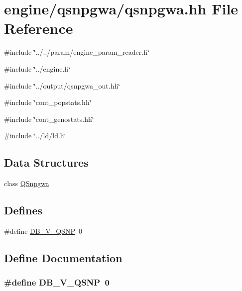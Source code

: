 \hypertarget{qsnpgwa_8hh}{
\section{engine/qsnpgwa/qsnpgwa.hh File Reference}
\label{qsnpgwa_8hh}
}
{\ttfamily \#include \char`\"{}../../param/engine\_\-param\_\-reader.h\char`\"{}}\par
{\ttfamily \#include \char`\"{}../engine.h\char`\"{}}\par
{\ttfamily \#include \char`\"{}../output/qsnpgwa\_\-out.hh\char`\"{}}\par
{\ttfamily \#include \char`\"{}cont\_\-popstats.hh\char`\"{}}\par
{\ttfamily \#include \char`\"{}cont\_\-genostats.hh\char`\"{}}\par
{\ttfamily \#include \char`\"{}../ld/ld.h\char`\"{}}\par
\subsection*{Data Structures}
\begin{DoxyCompactItemize}
\item 
class \hyperlink{classQSnpgwa}{QSnpgwa}
\end{DoxyCompactItemize}
\subsection*{Defines}
\begin{DoxyCompactItemize}
\item 
\#define \hyperlink{qsnpgwa_8hh_ab2547775621126760f3c823b3a03eb08}{DB\_\-V\_\-QSNP}~0
\end{DoxyCompactItemize}


\subsection{Define Documentation}
\hypertarget{qsnpgwa_8hh_ab2547775621126760f3c823b3a03eb08}{
\subsubsection[{DB\_\-V\_\-QSNP}]{\setlength{\rightskip}{0pt plus 5cm}\#define DB\_\-V\_\-QSNP~0}}
\label{qsnpgwa_8hh_ab2547775621126760f3c823b3a03eb08}
